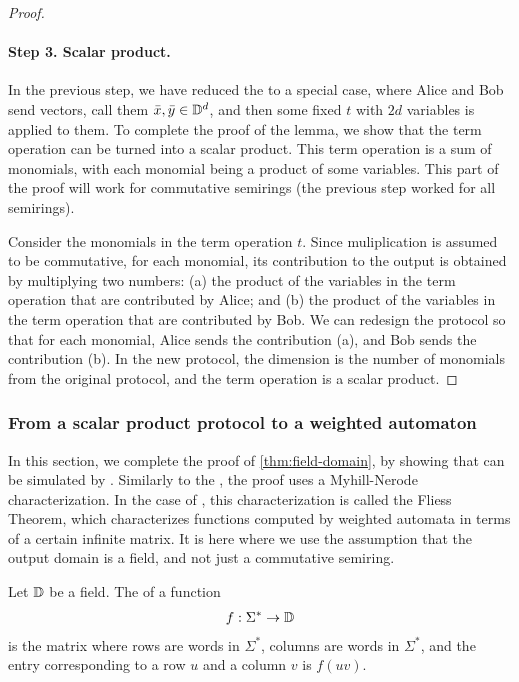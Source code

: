 \begin{proof}
 \paragraph*{Step 3. Scalar product.}
 In the previous step, we have reduced the  to a special case, where
 Alice and Bob send vectors, call them $\bar x, \bar y \in \mathbb D^d$, and then
 some fixed  $t$ with $2d$ variables is applied to them. To
 complete the proof of the lemma, we show that the term operation can be turned
 into a scalar product. This term operation is a sum of monomials, with each
 monomial being a product of some variables. This part of the proof will work for commutative semirings (the previous step worked for all semirings). 
 
 Consider the monomials in the term
 operation $t$. Since muliplication is assumed to be  commutative, for each monomial, its contribution to the output  is obtained
 by multiplying two numbers: (a) the product of the  variables in the term
 operation that are contributed by Alice; and   (b) the product of the
 variables in the term operation that are contributed by Bob. We can redesign
 the protocol so that for each monomial, Alice sends the contribution (a), and
 Bob sends the contribution (b). In the new protocol, the dimension is the
 number of monomials from the original protocol, and the term operation is a
 scalar product. 
\end{proof}

\subsubsection{From a scalar product protocol to a weighted automaton}
\label{sec:from-scalar-product-protocol-to-weighted-automaton}
\AP
In this section, we complete the proof of \cref{thm:field-domain}, by showing
that  can be simulated by .
Similarly to the , the proof uses a
Myhill-Nerode characterization. In the case of , this
characterization is called  the Fliess Theorem, which characterizes
functions computed by weighted automata in terms of a certain infinite matrix. It is here where we use the assumption that the output domain is a field, and not just a commutative semiring.


\begin{definition}\label{def:hankel-matrix}
  \AP
    Let $\mathbb D$ be a field. The  of a function 
    \begin{align*}
    f : \Sigma^* \to \mathbb D
    \end{align*}  
    is the matrix where rows are words in $\Sigma^*$, columns are words in $\Sigma^*$, and the entry corresponding to a row $u$ and a column $v$ is $f(uv)$.
\end{definition}

